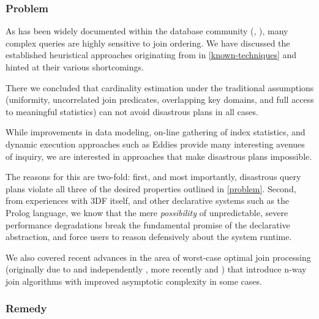 \documentclass[../catalog.tex]{subfiles}
\begin{document}
\subsubsection{Problem}

As has been widely documented within the database community
(\cite{leis2015good}, \cite{lohman2014query}), many complex queries
are highly sensitive to join ordering. We have discussed the
established heuristical approaches originating from
\cite{selinger1979access} in \ref{known-techniques} and hinted at
their various shortcomings.

There we concluded that cardinality estimation under the traditional
assumptions (uniformity, uncorrelated join predicates, overlapping key
domains, and full access to meaningful statistics) can not avoid
disastrous plans in all cases.

While improvements in data modeling, on-line gathering of index
statistics, and dynamic execution approaches such as Eddies provide
many interesting avenues of inquiry, we are interested in approaches
that make disastrous plans impossible.

The reasons for this are two-fold: first, and most importantly,
disastrous query plans violate all three of the desired properties
outlined in \ref{problem}. Second, from experiences with 3DF itself,
and other declarative systems such as the Prolog language, we know
that the mere \emph{possibility} of unpredictable, severe performance
degradations break the fundamental promise of the declarative
abstraction, and force users to reason defensively about the system
runtime.

We also covered recent advances in the area of worst-case optimal join
processing (originally due to \cite{ngo2012worst} and independently
\cite{veldhuizen2012leapfrog}, more recently
\cite{ammar2018distributed} and \cite{ciucanu2015worst}) that
introduce n-way join algorithms with improved asymptotic complexity in
some cases.

\subsubsection{Remedy}
\end{document}
